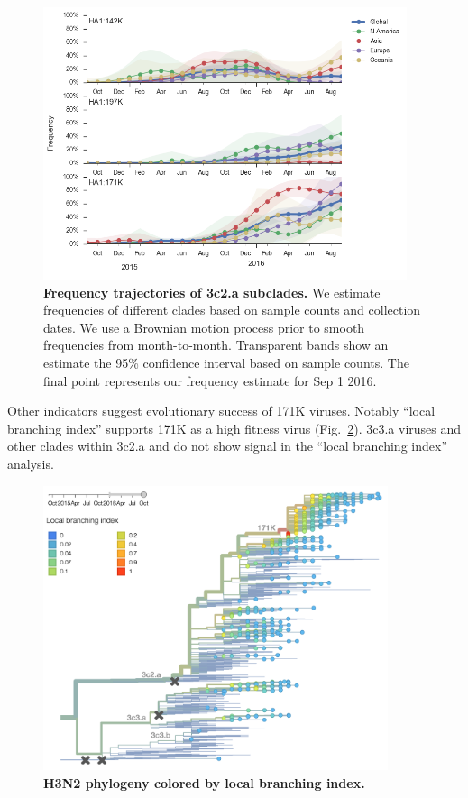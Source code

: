 \documentclass[11pt,oneside,letterpaper]{article}
\begin{document}
\begin{figure}[H]
	\centering
	\includegraphics[width=0.95\textwidth]{../figures/sep-2016/H3N2_mutations.png}
	\caption{\textbf{Frequency trajectories of 3c2.a subclades.}
	We estimate frequencies of different clades based on sample counts and collection dates.
	We use a Brownian motion process prior to smooth frequencies from month-to-month.
	Transparent bands show an estimate the 95\% confidence interval based on sample counts.
	The final point represents our frequency estimate for Sep 1 2016.
	}
	\label{H3N2_mutations}
\end{figure}

\pagebreak

Other indicators suggest evolutionary success of 171K viruses. Notably ``local branching index'' \cite{neher2014predicting} supports 171K as a high fitness virus (Fig.\ \ref{H3N2_LBI}). 3c3.a viruses and other clades within 3c2.a and do not show signal in the ``local branching index'' analysis.

\begin{figure}[H]
	\centering
	\includegraphics[width=0.9\textwidth]{../figures/sep-2016/H3N2_LBI.png}
	\caption{\textbf{H3N2 phylogeny colored by local branching index.}
	}
	\label{H3N2_LBI}
\end{figure}
\end{document}
